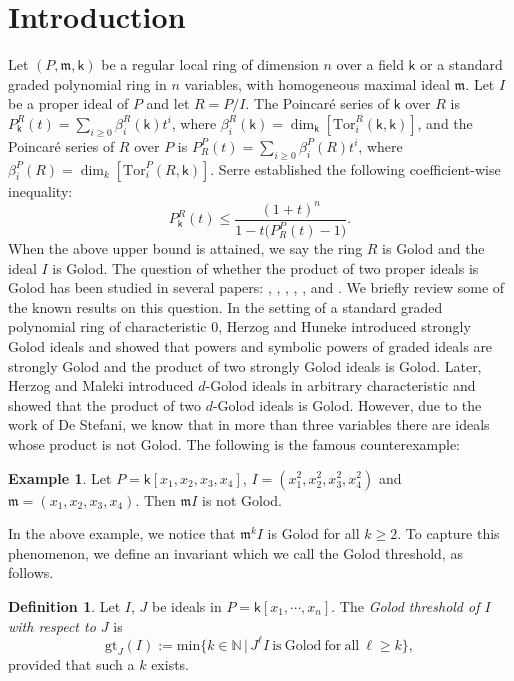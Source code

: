 \documentclass[10pt,reqno]{amsart}
\newcounter{intro}
\theoremstyle{definition}
\newtheorem{example}[subsection]{Example}
\newtheorem{definition}[subsection]{Definition}
\theoremstyle{remark}
\numberwithin{equation}{section}
\newcommand{\Tor}{\mathrm{Tor}}
\newcommand{\kk}{\mathsf k}
\newcommand{\m}{\mathfrak m}
\numberwithin{equation}{section}
\begin{document}
\section{Introduction}
Let $(P,\m,\kk)$ be a regular local ring of dimension $n$ over a field $\kk$ or a standard graded polynomial ring in $n$ variables, with homogeneous maximal ideal $\m$. Let $I$ be a proper ideal of $P$ and let $R=P/I$. The Poincar\'{e} series of $\kk $ over $R$ is $P_\kk^R(t)=\sum_{i\geq0}\beta_i^R(\kk)t^i$, where $\beta_{i}^R(\kk)=\dim_{\kk}[\Tor_i^R(\kk,\kk)]$, and the Poincar\'{e} series of $R$ over $P$ is $P_R^P(t)=\sum_{i\geq0}\beta_i^P(R)t^i$, where $\beta_{i}^P(R)=\dim_k[\Tor_i^P(R,\kk)]$. Serre established the following coefficient-wise inequality:
\[
P_\kk^R(t)
\leq
\frac{(1+t)^n}
{1-t\bigl(P_R^P(t)-1\bigr)}.
\]
When the above upper bound is attained, we say the ring $R$ is Golod and the ideal $I$ is Golod. The question of whether the product of two proper ideals is Golod has been studied in several papers: \cite{herzog1979golodideale}, \cite{herzog2013ordinary}, \cite{de2016products}, \cite{herzog2016homology}, \cite{maleki2019golod}, \cite{herzog2018koszul} and \cite{vandebogert2022products}. We briefly review some of the known results on this question. In the setting of a standard graded polynomial ring of characteristic $0$, Herzog and Huneke \cite{herzog2013ordinary} introduced strongly Golod ideals and showed that powers and symbolic powers of graded ideals are strongly Golod and the product of two strongly Golod ideals is Golod. Later, Herzog and Maleki \cite{herzog2018koszul} introduced $d$-Golod ideals in arbitrary characteristic and showed that the product of two $d$-Golod ideals is Golod. However, due to the work of De Stefani, we know that in more than three variables there are ideals whose product is not Golod. The following is the famous counterexample:\begin{example}\cite[Example 2.1]{de2016products}
    Let $P=\kk[x_1,x_2,x_3,x_4]$, $I=(x_1^2, x_2^2, x_3^2, x_4^2)$ and $\m=(x_1, x_2, x_3, x_4)$. Then $\m I$ is not Golod. 
\end{example} 
In the above example, we notice that $\m^kI$ is Golod for all $k\geq 2$. To capture this phenomenon, we define an invariant which we call the Golod threshold, as follows. 
\begin{definition}\label{golodthresholddef}
    Let $I$, $J$ be ideals in $P=\kk[x_1,\cdots,x_n]$.
    The {\em Golod threshold of $I$ with respect to $J$} is
    $$
    \mathrm{gt}_J(I):=\mathrm{min}\{k \in \mathbb N\, | \, J^{\ell } I \ \mathrm{is \ 
    Golod\ for \ all \ } \ell \ge k\},
    $$
    provided that such a $k$ exists.
\end{definition}
\end{document}
